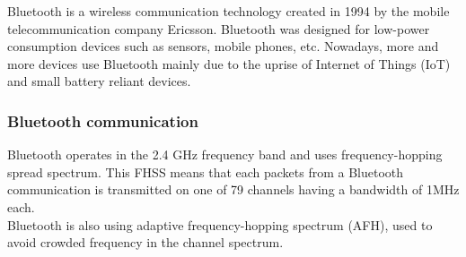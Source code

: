 Bluetooth is a wireless communication technology created in 1994 by the mobile telecommunication company Ericsson. Bluetooth was designed for low-power consumption devices such as sensors, mobile phones, etc. Nowadays, more and more devices use Bluetooth mainly due to the uprise of Internet of Things (IoT) and small battery reliant devices.

\subsubsection{Bluetooth communication}
Bluetooth operates in the 2.4 GHz frequency band and uses frequency-hopping spread spectrum. This FHSS means that each packets from a Bluetooth communication is transmitted on one of 79 channels having a bandwidth of 1MHz each.\\
Bluetooth is also using adaptive frequency-hopping spectrum (AFH), used to avoid crowded frequency in the channel spectrum.\\


